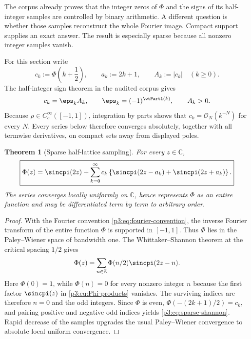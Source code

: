 \documentclass[11pt,oneside]{article}
\newtheorem{theorem}{Theorem}[section]
\theoremstyle{definition}
\newcommand{\C}{\mathbb C}
\newcommand{\bigO}{\mathcal O}
\begin{document}
The corpus already proves that the integer zeros of \(\Phi\) and the signs of its
half-integer samples are controlled by binary arithmetic.  A different question is whether
those samples reconstruct the whole Fourier image.  Compact support supplies an exact
answer.  The result is especially sparse because all nonzero integer samples vanish.

For this section write
\begin{equation}
 c_k:=\Phi\!\left(k+\frac12\right),\qquad a_k:=2k+1,
 \qquad A_k:=|c_k| \quad(k\ge0).                         \label{p3:eq:ck-def}
\end{equation}
The half-integer sign theorem in the audited corpus gives
\begin{equation}
 c_k=\eps_kA_k,
 \qquad \eps_k=(-1)^{\wtPartl(k)},
 \qquad A_k>0.                                            \label{p3:eq:ck-sign}
\end{equation}
Because \(\rho\in C_c^\infty([-1,1])\), integration by parts shows that
\(c_k=\bigO_N(k^{-N})\) for every \(N\).  Every series below therefore converges
absolutely, together with all termwise derivatives, on compact sets away from displayed
poles.

\begin{theorem}[Sparse half-lattice sampling]
\label{p3:thm:sparse-shannon}
For every \(z\in\C\),
\begin{equation}
\boxed{
 \Phi(z)=\sincpi(2z)
 +\sum_{k=0}^{\infty}c_k
 \left\{
   \sincpi(2z-a_k)+\sincpi(2z+a_k)
 \right\}.}                                               \label{p3:eq:sparse-shannon}
\end{equation}
The series converges locally uniformly on \(\C\), hence represents \(\Phi\) as an
entire function and may be differentiated term by term to arbitrary order.
\end{theorem}

\begin{proof}
With the Fourier convention \eqref{p3:eq:fourier-convention}, the inverse Fourier transform
of the entire function \(\Phi\) is supported in \([-1,1]\).  Thus \(\Phi\) lies in the
Paley--Wiener space of bandwidth one.  The Whittaker--Shannon theorem \cite{p3:HigginsSampling} at the critical
spacing \(1/2\) gives
\begin{equation}
 \Phi(z)=\sum_{n\in\mathbb Z}\Phi(n/2)\sincpi(2z-n).
                                                               \label{p3:eq:full-shannon}
\end{equation}
Here \(\Phi(0)=1\), while \(\Phi(n)=0\) for every nonzero integer \(n\) because the
first factor \(\sincpi(z)\) in \eqref{p3:eq:Phi-products} vanishes.  The surviving indices
are therefore \(n=0\) and the odd integers.  Since \(\Phi\) is even,
\(\Phi(-(2k+1)/2)=c_k\), and pairing positive and negative odd indices yields
\eqref{p3:eq:sparse-shannon}.  Rapid decrease of the samples upgrades the usual
Paley--Wiener convergence to absolute local uniform convergence.
\end{proof}
\end{document}
